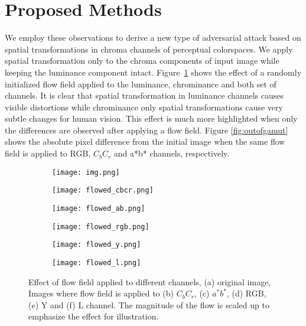 \section{Proposed Methods}
We employ these observations to derive a new type of adversarial attack based on spatial transformations in chroma channels of perceptual colorspaces. We apply spatial transformation only to the chroma components of input image while keeping the luminance component intact. Figure~\ref{fig:flowtochannels} shows the effect of a randomly initialized flow field applied to the luminance, chrominance and both set of channels. It is clear that spatial transformation in luminance channels causes visible distortions while chrominance only spatial transformations cause very subtle changes for human vision. This effect is much more highlighted when only the differences are observed after applying a flow field. Figure \ref{fig:outofgamut} shows the absolute pixel difference from the initial image when the same flow field is applied to RGB, \(C_{b}C_{r}\) and a*b* channels, respectively.
\begin{figure}[t]
    \centering
    \begin{subfigure}[b]{.30\linewidth}
        \texttt{[image: img.png]}
        \caption{}
    \end{subfigure}
    \begin{subfigure}[b]{.30\linewidth}
        \texttt{[image: flowed\_cbcr.png]}
        \caption{}
    \end{subfigure}
    \begin{subfigure}[b]{.30\linewidth}
        \texttt{[image: flowed\_ab.png]}
        \caption{}
    \end{subfigure}
    \begin{subfigure}[b]{.30\linewidth}
        \texttt{[image: flowed\_rgb.png]}
        \caption{}
    \end{subfigure}
    \begin{subfigure}[b]{.30\linewidth}
        \texttt{[image: flowed\_y.png]}
        \caption{}
    \end{subfigure}
    \begin{subfigure}[b]{.30\linewidth}
        \texttt{[image: flowed\_l.png]}
        \caption{}
    \end{subfigure}
    \caption{Effect of flow field applied to different channels, (a) original image, Images where flow field is applied to (b) \(C_{b}C_{r}\), (c) \(a^*b^*\), (d) RGB, (e) Y and (f) L channel. The magnitude of the flow is scaled up to emphasize the effect for illustration.}\label{fig:flowtochannels}
\end{figure}

